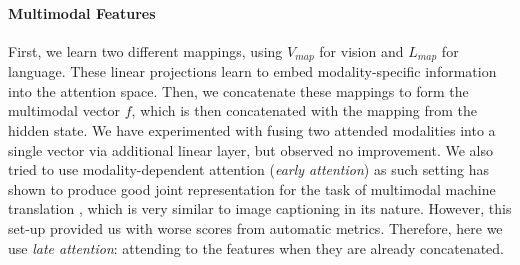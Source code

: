 \documentclass[11pt,a4paper]{article}
\begin{document}
\paragraph{Multimodal Features}
First, we learn two different mappings, using $V_{map}$ for vision and $L_{map}$ for language.
These linear projections learn to embed modality-specific information into the attention space.
Then, we concatenate these mappings to form the multimodal vector $f$, which is then concatenated with the mapping from the hidden state.
We have experimented with fusing two attended modalities into a single vector via additional linear layer, but observed no improvement.
We also tried to use modality-dependent attention (\textit{early attention}) as such setting has shown to produce good joint representation for the task of multimodal machine translation \cite{Caglayan2016,Caglayan2019}, which is very similar to image captioning in its nature.
However, this set-up provided us with worse scores from automatic metrics.
Therefore, here we use \textit{late attention}: attending to the features when they are already concatenated.
\end{document}
